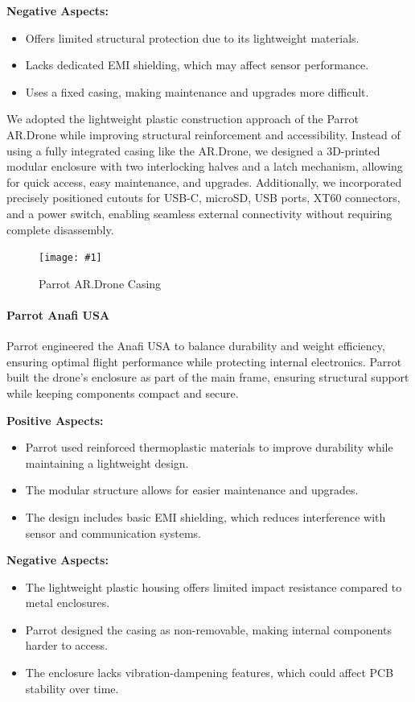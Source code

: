 \documentclass[12pt]{article}
\newcommand{\quickfigure}[4]{%
\begin{figure}[!htbp]
\centering
\texttt{[image: \#1]}
\caption{#3}
\label{#4}
\end{figure}%
}
\begin{document}
\textbf{Negative Aspects:}
\begin{itemize}
    \item Offers limited structural protection due to its lightweight materials.
    \item Lacks dedicated EMI shielding, which may affect sensor performance.
    \item Uses a fixed casing, making maintenance and upgrades more difficult.
\end{itemize}

\par We adopted the lightweight plastic construction approach of the Parrot AR.Drone while improving structural reinforcement and accessibility. Instead of using a fully integrated casing like the AR.Drone, we designed a 3D-printed modular enclosure with two interlocking halves and a latch mechanism, allowing for quick access, easy maintenance, and upgrades. Additionally, we incorporated precisely positioned cutouts for USB-C, microSD, USB ports, XT60 connectors, and a power switch, enabling seamless external connectivity without requiring complete disassembly.

\quickfigure{images/parrot-AR-drone-casing.jpg}{15cm}{Parrot AR.Drone Casing}{parrot-ardrone-casing}

\paragraph{Parrot Anafi USA}

\par Parrot engineered the Anafi USA to balance durability and weight efficiency, ensuring optimal flight performance while protecting internal electronics. Parrot built the drone’s enclosure as part of the main frame, ensuring structural support while keeping components compact and secure.

\textbf{Positive Aspects:}
\begin{itemize}
    \item Parrot used reinforced thermoplastic materials to improve durability while maintaining a lightweight design.
    \item The modular structure allows for easier maintenance and upgrades.
    \item The design includes basic EMI shielding, which reduces interference with sensor and communication systems.
\end{itemize}

\textbf{Negative Aspects:}
\begin{itemize}
    \item The lightweight plastic housing offers limited impact resistance compared to metal enclosures.
    \item Parrot designed the casing as non-removable, making internal components harder to access.
    \item The enclosure lacks vibration-dampening features, which could affect PCB stability over time.
\end{itemize}
\end{document}
